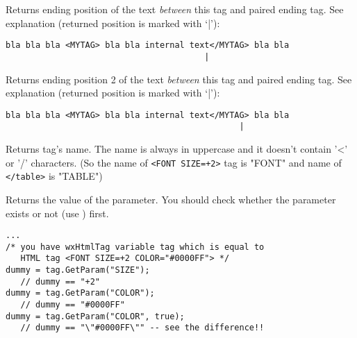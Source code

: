 Returns ending position of the text {\it between} this tag and paired
ending tag.
See explanation (returned position is marked with `|'):

\begin{verbatim}
bla bla bla <MYTAG> bla bla internal text</MYTAG> bla bla
                                        |
\end{verbatim}


\label{wxhtmltaggetendpos2}


Returns ending position 2 of the text {\it between} this tag and paired
ending tag.
See explanation (returned position is marked with `|'):

\begin{verbatim}
bla bla bla <MYTAG> bla bla internal text</MYTAG> bla bla
                                               |
\end{verbatim}

\label{wxhtmltaggetname}


Returns tag's name. The name is always in uppercase and it doesn't contain
'<' or '/' characters. (So the name of {\tt <FONT SIZE=+2>} tag is "FONT"
and name of {\tt </table>} is "TABLE")


\label{wxhtmltaggetparam}


Returns the value of the parameter. You should check whether the
parameter exists or not (use ) first.





\begin{verbatim}
...
/* you have wxHtmlTag variable tag which is equal to
   HTML tag <FONT SIZE=+2 COLOR="#0000FF"> */
dummy = tag.GetParam("SIZE");
   // dummy == "+2"
dummy = tag.GetParam("COLOR");
   // dummy == "#0000FF"
dummy = tag.GetParam("COLOR", true);
   // dummy == "\"#0000FF\"" -- see the difference!!
\end{verbatim}

